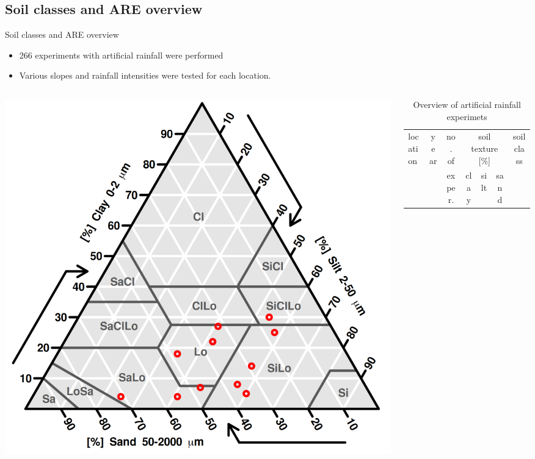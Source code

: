 \subsection{Soil classes and ARE overview}
\begin{block}{Soil classes and ARE overview}
    \begin{itemize}
        \item 266 experiments with artificial rainfall were performed 
        \item Various slopes and rainfall intensities were tested for each location.
    \end{itemize}\vspace{-1cm}
% 
    \begin{columns}
        \begin{column}{0.4\textwidth}
            \includegraphics[width=.95\textwidth]{obr/soil_triangle.png}
        \end{column}
        \begin{column}{0.6\textwidth}
            {\small 
            \begin{table}[]
            \caption{Overview of artificial rainfall experimets}
                \begin{tabular}{lcccccc}
                \hline
                \hline
                location      & year    & no. of            & \multicolumn{3}{c}{soil texture {[}\%{]}}  & soil class      \\
                            &         & exper.       & clay  & silt  & sand &  \\

\end{tabular}
\end{table}}
\end{column}
\end{columns}
\end{block}
